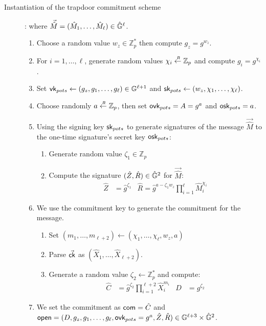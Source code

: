 \begin{section}{Instantiation of the trapdoor commitment scheme}
\begin{description}
  \item[]: where $\vec{\hat{M}} = (\hat{M}_1, \dots, \hat{M}_\ell) \in \hat{\mathbb{G}}^\ell$.
    \begin{enumerate}
    \item Choose a random value $w_z \in \mathbb{Z}_p^*$ then compute $g_z = g^{w_z}$.
    \item For $i = 1, \dots, \ell$, generate random values $\chi_i \stackrel{{\scriptscriptstyle \mkern4mu R}}{\gets} \mathbb{Z}_p$ and compute $g_i = g^{\chi_i}$.
    \item Set $\mathsf{vk}_{pots} \gets (g_z, g_1, \dots, g_\ell) \in \mathbb{G}^{\ell+1}$ and $\mathsf{sk}_{pots} \gets (w_z,\chi_1, \dots, \chi_\ell)$.
    \item Choose randomly $a \stackrel{{\scriptscriptstyle \mkern4mu R}}{\gets} \mathbb{Z}_p$, then set $\mathsf{ovk}_{pots} =A = g^{a}$ and $\mathsf{osk}_{pots} = a$.
    \item Using the signing key $\mathsf{sk}_{pots}$ to generate signatures of the message $\vec{\hat{M}}$ \wrt to the one-time signature's secret key $\mathsf{osk}_{pots}$:
    	\begin{enumerate}
		\item Generate random value $\zeta_1 \in \mathbb{Z}_p$
		\item Compute the signature $(\hat{Z}, \hat{R}) \in \hat{\mathbb{G}}^2$ for $\vec{\hat{M}}$:
		\begin{align*}
			\hat{Z} &= \hat{g}^{\zeta_1} & \hat{R} = \hat{g}^{a-\zeta_1 w_z}\prod_{i=1}^{\ell} \hat{M}_i^{\chi_i} 
		\end{align*}
		\end{enumerate}
	\item We use the commitment key to generate the commitment for the message.
		\begin{enumerate}
		\item Set $(m_1, \dots, m_{\ell+2}) \gets (\chi_1, \dots, \chi_\ell, w_z, a)$ 
		\item Parse $\vec{\mathsf{ck}}$ as $(\hat{X}_1, \dots, \hat{X}_{\ell+2})$.
		\item Generate a random value $\zeta_2 \gets \mathbb{Z}_p^*$ and compute:
		\begin{align*}
		\hat{C} &= \hat{g}^{\zeta_2}\prod_{i = 1}^{\ell+2}\hat{X}_i^{m_i} & D &= g^{\zeta_2}
		\end{align*}
		\end{enumerate}
	\item We set the commitment as $\mathsf{com}  = \hat{C}$ and $\mathsf{open} = (D, g_z, g_1, \dots, g_\ell, \mathsf{ovk}_{pots} = g^a, \hat{Z}, \hat{R}) \in \mathbb{G}^{\ell+3} \times \hat{\mathbb{G}}^{2}$.
	\end{enumerate}
	

\end{description}
\end{section}
